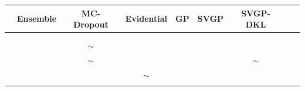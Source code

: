 
\newcommand{\tick}{{\color{mygreen}\cmark}}
\newcommand{\cross}{{\color{red}\xmark}}
\newcommand{\neutral}{{\color{orange}$\bm{\sim}$}}

\begin{tabular}{lcccccccc}
\toprule
{} & Ensemble & MC-Dropout & Evidential & GP & SVGP & SVGP-DKL & \oursacro{}\\
\midrule
\desone{} & \tick & \tick & \tick & \tick & \cross & \tick & \tick \\
\destwo{} & \tick & \tick & \tick & \tick & \cross & \tick & \tick \\
\desfour{} &  \tick & \neutral & \cross & \cross & \cross & \cross & \tick  \\
\desfive{} & \tick & \neutral & \tick & \cross & \cross & \neutral & \tick \\
\dessix{} & \tick & \tick & \neutral & \tick & \tick & \tick & \tick \\
\desseven{} & \cross & \cross & \tick & \cross & \tick & \tick & \tick \\
\bottomrule
\end{tabular}
